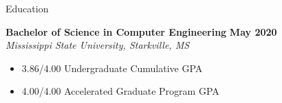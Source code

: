 \documentclass{resume} %
\begin{document}

\begin{rSection}{Education}

{\bf Bachelor of Science in Computer Engineering} \hfill {\bf May 2020} 
\\ {\em Mississippi State University, Starkville, MS}
\begin{itemize}
    \item 3.86/4.00 Undergraduate Cumulative GPA
    \item 4.00/4.00 Accelerated Graduate Program GPA
\end{itemize}


\end{rSection}
\end{document}
